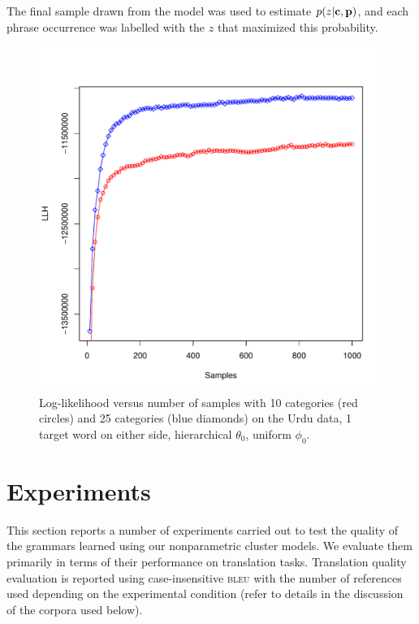 The final sample drawn from the model was used to estimate $p(z|\textbf{c},\textbf{p})$, and each phrase occurrence was labelled with the $z$ that maximized this probability.

\begin{figure}
\begin{center}
\includegraphics[scale=0.75]{pyp_clustering/llh.pdf}
\vspace{-0.3cm}
\end{center}
\caption{Log-likelihood versus number of samples with 10 categories (red circles) and 25 categories (blue diamonds) on the Urdu data, 1 target word on either side, hierarchical $\theta_0$, uniform $\phi_0$.}
\label{fig:llh}
\end{figure}

\section{Experiments}

This section reports a number of experiments carried out to test the quality of the grammars learned using our nonparametric cluster models.  We evaluate them primarily in terms of their performance on translation tasks.  Translation quality evaluation is reported using case-insensitive \textsc{bleu} \citep{bleu} with the number of references used depending on the experimental condition (refer to details in the discussion of the corpora used below).


